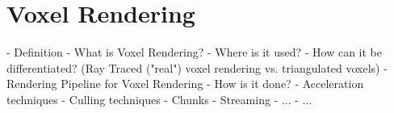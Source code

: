 \chapter{Voxel Rendering}






- Definition
    - What is Voxel Rendering?
    - Where is it used? 
    - How can it be differentiated? (Ray Traced ("real") voxel rendering vs. triangulated voxels)
- Rendering Pipeline for Voxel Rendering
    - How is it done?
- Acceleration techniques
    - Culling techniques
    - Chunks
    - Streaming
    - ...
- ...


